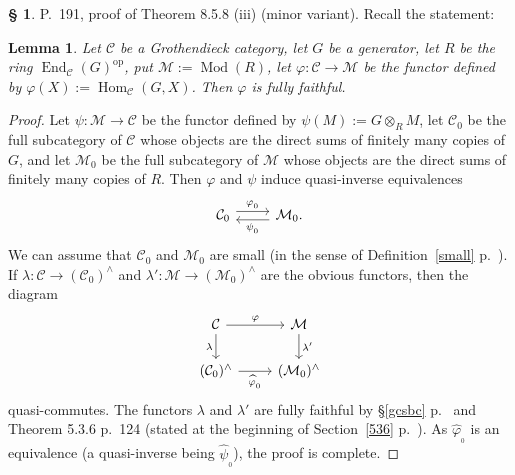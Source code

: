 \documentclass[12pt]{article}%
\newtheorem{lem}[thm]{Lemma}
\theoremstyle{remark}
\theoremstyle{definition}
\newtheorem{s}[thm]{\S}%
\newcommand{\C}{\mathcal C}
\newcommand{\M}{\mathcal M}
\newcommand{\pp}{\varphi}
\DeclareMathOperator{\Hom}{Hom}%
\DeclareMathOperator{\Mod}{Mod}
\DeclareMathOperator{\op}{op}
\begin{document}
%

\begin{s} P.~191, proof of Theorem 8.5.8 (iii) (minor variant). Recall the statement: 

\begin{lem}\label{858iii}
Let $\C$ be a Grothendieck category, let $G$ be a generator, let $R$ be the ring $\operatorname{End}_\C(G)^{\op}$, put $\M:=\Mod(R)$, let $\pp:\C\to\M$ be the functor defined by $\pp(X):=\Hom_\C(G,X)$. Then $\pp$ is fully faithful. 
\end{lem}

\begin{proof}
Let $\psi:\M\to\C$ be the functor defined by $\psi(M):=G\otimes_RM$, let $\C_0$ be the full subcategory of $\C$ whose objects are the direct sums of finitely many copies of $G$, and let $\M_0$ be the full subcategory of $\M$ whose objects are the direct sums of finitely many copies of $R$. Then $\pp$ and $\psi$ induce quasi-inverse equivalences 
$$
\begin{tikzcd}
\C_0\ar[yshift=.7ex]{r}{\pp_{{}_0}}&\M_0.\ar[yshift=-.7ex]{l}{\psi_{{}_0}}
\end{tikzcd}
$$ 
We can assume that $\C_0$ and $\M_0$ are small (in the sense of Definition~\ref{small} p.~\pageref{small}). If $\lambda:\C\to(\C_0)^\wedge$ and $\lambda':\M\to(\M_0)^\wedge$ are the obvious functors, then the diagram 
$$
\begin{tikzcd}
\C\ar{r}{\pp}\ar{d}[swap]{\lambda}&\M\ar{d}{\lambda'}\\
(\C_0)^\wedge\ar{r}[swap]{\widehat\pp_{{}_0}}&(\M_0)^\wedge
\end{tikzcd}
$$ 
quasi-commutes. The functors $\lambda$ and $\lambda'$ are fully faithful by \S\ref{gcsbc} p.~\pageref{gcsbc} and Theorem 5.3.6 p.~124 (stated at the beginning of Section~\ref{536} p.~\pageref{536}). %
 As $\widehat\pp_{{}_0}$ is an equivalence (a quasi-inverse being $\widehat\psi_{{}_0}$), the proof is complete.
\end{proof}
\end{s}

%
\end{document}
